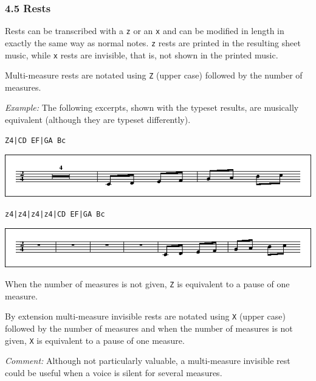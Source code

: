 \documentclass[oneside]{book}
\begin{document}
\hypertarget{rests}{\subsubsection{4.5 Rests}\label{rests}}

Rests can be transcribed with a \texttt{z} or an \texttt{x} and can be
modified in length in exactly the same way as normal notes. \texttt{z}
rests are printed in the resulting sheet music, while \texttt{x} rests
are invisible, that is, not shown in the printed music.

Multi-measure rests are notated using \texttt{Z} (upper case) followed
by the number of measures.

\emph{Example:} The following excerpts, shown with the typeset results,
are musically equivalent (although they are typeset differently).

\begin{verbatim}
Z4|CD EF|GA Bc
\end{verbatim}

\href{/wiki/_detail/abc:standard:rests1-80.png?id=abc\%3Astandard\%3Av2.1}{\includegraphics{wiki/_media/abc-standard-rests1-80.png}}

\begin{verbatim}
z4|z4|z4|z4|CD EF|GA Bc
\end{verbatim}

\href{/wiki/_detail/abc:standard:rests2-80.png?id=abc\%3Astandard\%3Av2.1}{\includegraphics{wiki/_media/abc-standard-rests2-80.png}}

When the number of measures is not given, \texttt{Z} is equivalent to a
pause of one measure.

By extension multi-measure invisible rests are notated using \texttt{X}
(upper case) followed by the number of measures and when the number of
measures is not given, \texttt{X} is equivalent to a pause of one
measure.

\emph{Comment:} Although not particularly valuable, a multi-measure
invisible rest could be useful when a voice is silent for several
measures.
\end{document}
